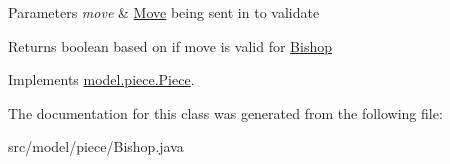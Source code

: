 \begin{DoxyParams}{Parameters}
{\em move} & \hyperlink{classmodel_1_1_move}{Move} being sent in to validate \\
\hline
\end{DoxyParams}
\begin{DoxyReturn}{Returns}
boolean based on if move is valid for \hyperlink{classmodel_1_1piece_1_1_bishop}{Bishop} 
\end{DoxyReturn}


Implements \hyperlink{classmodel_1_1piece_1_1_piece_af7ce06755c9f20f3481796ca5b512849}{model.\-piece.\-Piece}.



The documentation for this class was generated from the following file\-:\begin{DoxyCompactItemize}
\item 
src/model/piece/Bishop.\-java\end{DoxyCompactItemize}
